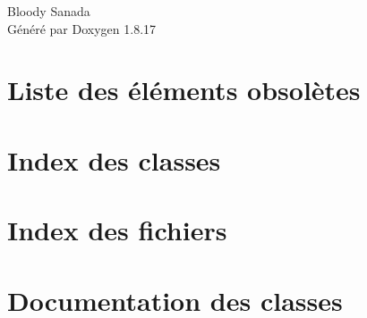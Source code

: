 \let\mypdfximage\pdfximage\def\pdfximage{\immediate\mypdfximage}\documentclass[twoside]{book}
\newcommand{\+}{\discretionary{\mbox{\scriptsize$\hookleftarrow$}}{}{}}
\newcommand{\clearemptydoublepage}{%
  \newpage{\pagestyle{empty}\cleardoublepage}%
}
\begin{document}
\hypersetup{pageanchor=false,
             bookmarksnumbered=true,
             pdfencoding=unicode
            }
\begin{titlepage}
\vspace*{7cm}
\begin{center}%
{\Large Bloody Sanada }\\
\vspace*{1cm}
{\large Généré par Doxygen 1.8.17}\\
\end{center}
\end{titlepage}
\clearemptydoublepage
{}
\tableofcontents
\clearemptydoublepage
{}
\hypersetup{pageanchor=true}

\chapter{Liste des éléments obsolètes}
\label{deprecated}

\chapter{Index des classes}

\chapter{Index des fichiers}

\chapter{Documentation des classes}






















\end{document}
